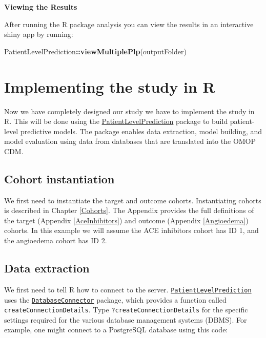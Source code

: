 \documentclass[11pt]{book}
\newenvironment{Shaded}{\begin{snugshade}}{\end{snugshade}}
\newcommand{\KeywordTok}[1]{\textcolor[rgb]{0.13,0.29,0.53}{\textbf{#1}}}
\newcommand{\NormalTok}[1]{#1}
\newcommand{\OperatorTok}[1]{\textcolor[rgb]{0.81,0.36,0.00}{\textbf{#1}}}
\theoremstyle{definition}
\theoremstyle{definition}
\theoremstyle{definition}
\theoremstyle{remark}
\begin{document}
\textbf{Viewing the Results}

After running the R package analysis you can view the results in an interactive shiny app by running:

\begin{Shaded}
\begin{Highlighting}[]
\NormalTok{PatientLevelPrediction}\OperatorTok{::}\KeywordTok{viewMultiplePlp}\NormalTok{(outputFolder)}
\end{Highlighting}
\end{Shaded}

\newpage

\hypertarget{implementing-the-study-in-r}{%
\section{Implementing the study in R}\label{implementing-the-study-in-r}}

Now we have completely designed our study we have to implement the study in R. This will be done using the \href{https://ohdsi.github.io/PatientLevelPrediction/}{PatientLevelPrediction} package to build patient-level predictive models. The package enables data extraction, model building, and model evaluation using data from databases that are translated into the OMOP CDM.

\hypertarget{cohort-instantiation-1}{%
\subsection{Cohort instantiation}\label{cohort-instantiation-1}}

We first need to instantiate the target and outcome cohorts. Instantiating cohorts is described in Chapter \ref{Cohorts}. The Appendix provides the full definitions of the target (Appendix \ref{AceInhibitors}) and outcome (Appendix \ref{Angioedema}) cohorts. In this example we will assume the ACE inhibitors cohort has ID 1, and the angioedema cohort has ID 2.

\hypertarget{data-extraction-1}{%
\subsection{Data extraction}\label{data-extraction-1}}

We first need to tell R how to connect to the server. \href{https://ohdsi.github.io/PatientLevelPrediction/}{\texttt{PatientLevelPrediction}} uses the \href{https://ohdsi.github.io/DatabaseConnector/}{\texttt{DatabaseConnector}} package, which provides a function called \texttt{createConnectionDetails}. Type \texttt{?createConnectionDetails} for the specific settings required for the various database management systems (DBMS). For example, one might connect to a PostgreSQL database using this code:
\end{document}
